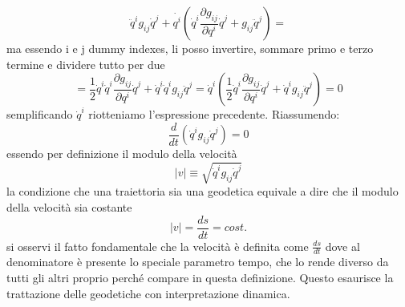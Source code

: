 \documentclass[
10pt, %
a4paper, %
oneside, %
headinclude,footinclude, %
BCOR5mm, %
]{scrartcl}
\begin{document}
\[\ddot{q}^ig_{ij}\dot{q}^j + \dot{q^i}\left(\dot{q}^i\frac{\partial g_{ij}}{\partial q^i}\dot{q}^j+ g_{ij}\ddot{q}^j \right)= \]
ma essendo i e j dummy indexes, li posso invertire, sommare primo e terzo termine e dividere tutto per due
\[=\frac{1}{2}\dot{q}^i\dot{q}^i\frac{\partial g_{ij}}{\partial q^i}\dot{q}^j+ \dot{q}^i\dot{q}^ig_{ij}\ddot{q}^j =
\dot{q}^i\left(\frac{1}{2}\dot{q}^i\frac{\partial g_{ij}}{\partial q^i}\dot{q}^j+ \dot{q}^ig_{ij}\ddot{q}^j\right) = 0\]
semplificando \(\dot{q}^i\) riotteniamo l'espressione precedente.
Riassumendo:
\[\frac{d}{dt}\left(\dot{q}^ig_{ij}\dot{q}^j\right) = 0\]
essendo per definizione il modulo della velocità 
\[|v| \equiv \sqrt{\dot{q}^ig_{ij}\dot{q}^j}\]
la condizione che una traiettoria sia una geodetica equivale a dire che il modulo della velocità sia costante
\[|v| = \frac{ds}{dt} = cost.\]
si osservi il fatto fondamentale che la velocità è definita come \(\frac{ds}{dt}\) dove al denominatore è presente lo speciale parametro tempo, che lo rende diverso da tutti gli altri proprio perché compare in questa definizione. Questo esaurisce la trattazione delle geodetiche con interpretazione dinamica.
\end{document}
